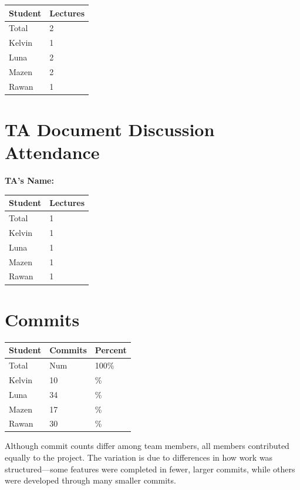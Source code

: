 \documentclass{article}
\begin{document}
\begin{table}[H]
\centering
\begin{tabular}{ll}
\toprule
\textbf{Student} & \textbf{Lectures}\\
\midrule
Total & 2\\
Kelvin & 1\\
Luna & 2\\
Mazen & 2\\
Rawan & 1\\
\bottomrule
\end{tabular}
\end{table}


\section{TA Document Discussion Attendance}

\noindent \textbf{TA's Name: }

\begin{table}[H]
\centering
\begin{tabular}{ll}
\toprule
\textbf{Student} & \textbf{Lectures}\\
\midrule
Total & 1\\
Kelvin & 1\\
Luna & 1\\
Mazen & 1\\
Rawan & 1\\
\bottomrule
\end{tabular}
\end{table}

\section{Commits}

\begin{table}[H]
\centering
\begin{tabular}{lll}
\toprule
\textbf{Student} & \textbf{Commits} & \textbf{Percent}\\
\midrule
Total & Num & 100\% \\
Kelvin & 10 & \% \\
Luna & 34 & \% \\
Mazen & 17 & \% \\
Rawan & 30 & \% \\
\bottomrule
\end{tabular}
\end{table}

Although commit counts differ among team members, all members contributed equally to the project. The variation is due to differences in how work was structured—some features were completed in fewer, larger commits, while others were developed through many smaller commits.
\end{document}

